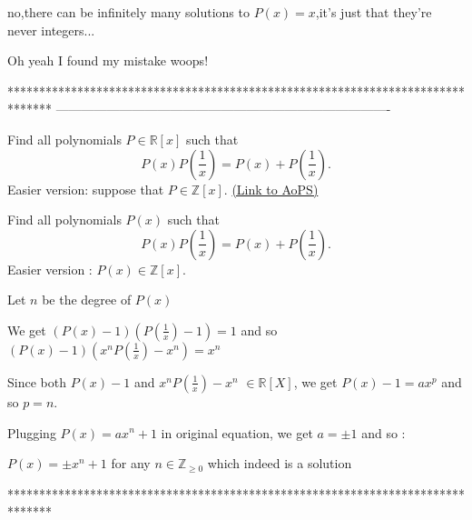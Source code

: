 \begin{solution}
	\begin{tcolorbox}

no,there can be infinitely many solutions to $P(x)=x$,it's just that they're never integers...\end{tcolorbox}

Oh yeah I found my mistake woops!

\end{solution}
*******************************************************************************
-------------------------------------------------------------------------------

\begin{problem}
	Find all polynomials $P\in \mathbb R[x]$ such that
\[P(x)P\left(\dfrac{1}{x}\right)=P(x)+P\left(\dfrac{1}{x}\right).\]
Easier version: suppose that $P \in \mathbb{Z}[x]$.
	\flushright \href{https://artofproblemsolving.com/community/c6h448417}{(Link to AoPS)}
\end{problem}



\begin{solution}
	\begin{tcolorbox}Find all polynomials $P(x)$ such that
\[P(x)P(\dfrac{1}{x})=P(x)+P(\dfrac{1}{x}).\]
Easier version :  $P(x) \in \mathbb{Z}[x].$\end{tcolorbox}
Let $n$ be the degree of $P(x)$

We get $(P(x)-1)(P(\frac 1x)-1)=1$ and so $(P(x)-1)(x^nP(\frac 1x)-x^n)=x^n$

Since both $P(x)-1$ and $x^nP(\frac 1x)-x^n$ $\in\mathbb R[X]$, we get $P(x)-1=ax^p$ and so $p=n$.

Plugging $P(x)=ax^n+1$ in original equation, we get $a=\pm 1$ and so :

$\boxed{P(x)=\pm x^n+1}$ for any $n\in\mathbb Z_{\ge 0}$ which indeed is a solution
\end{solution}
*******************************************************************************
